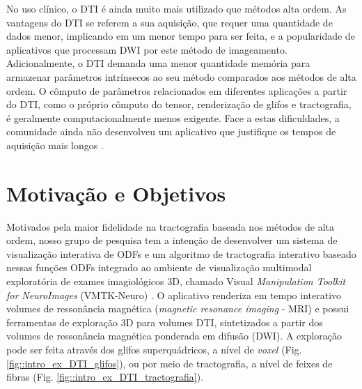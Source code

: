 \documentclass[
    12pt,                %
    oneside,            %
    a4paper,            %
    english,            %
    french,                %
    spanish,            %
    brazil                %
    ]{abntex2}
\begin{document}
No uso clínico, o DTI é ainda muito mais utilizado que métodos alta ordem. As vantagens do DTI se referem a sua aquisição, que requer uma quantidade de dados menor, implicando em um menor tempo para ser feita, e a popularidade de aplicativos que processam DWI por este método de imageamento. Adicionalmente, o DTI demanda uma menor quantidade memória para armazenar parâmetros intrínsecos ao seu método comparados aos métodos de alta ordem. O cômputo de parâmetros relacionados em diferentes aplicações a partir do DTI, como o próprio cômputo do tensor, renderização de glifos e tractografia, é geralmente computacionalmente menos exigente. Face a estas dificuldades, a comunidade ainda não desenvolveu um aplicativo que justifique os tempos de aquisição mais longos \cite{descoteaux2015}.








\section{Motivação e Objetivos}
\label{ssec:motivation}

Motivados pela maior fidelidade na tractografia baseada nos métodos de alta ordem, nosso grupo de pesquisa tem a intenção de desenvolver um sistema de visualização interativa de ODFs e um algoritmo de tractografia interativo baseado nessas funções ODFs integrado ao ambiente de visualização multimodal  exploratória de exames imagiológicos 3D, chamado Visual \textit{Manipulation Toolkit for NeuroImages} (VMTK-Neuro) \cite{VMTKNeuro}.  O aplicativo renderiza em tempo interativo volumes de ressonância magnética (\textit{magnetic resonance imaging} - MRI) e possui ferramentas de exploração 3D para volumes DTI, sintetizados a partir dos volumes de ressonância magnética ponderada em difusão (DWI). A exploração pode ser feita através dos glifos superquádricos, a nível de \textit{voxel} (Fig. \ref{fig::intro_ex_DTI_glifos}), ou por meio de tractografia, a nível de feixes de fibras (Fig. \ref{fig::intro_ex_DTI_tractografia}).
\end{document}

